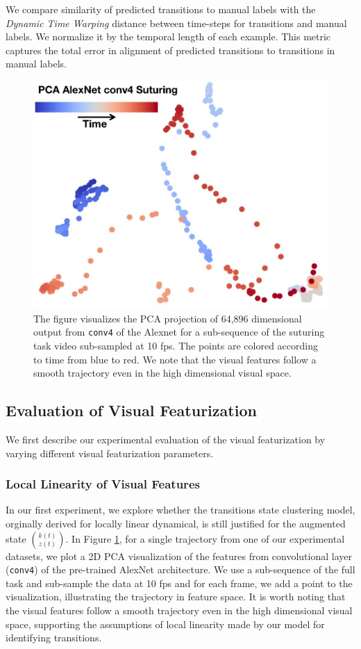 \documentclass[0-main.tex]{subfiles}
\begin{document}
We compare similarity of predicted transitions to manual labels with the \textit{Dynamic Time Warping} distance between time-steps for transitions and manual labels. We normalize it by the temporal length of each example. This metric captures the total error in alignment of predicted transitions to transitions in manual labels. 

\begin{figure}[t!]
\centering
\includegraphics[width=0.5\linewidth]{figures/pca_conv4.png}
\caption{The figure visualizes the PCA projection of 64,896 dimensional output from \texttt{conv4} of the Alexnet for a sub-sequence of the suturing task video sub-sampled at 10 fps. The points are colored according to time from blue to red. We note that the visual features follow a smooth trajectory even in the high dimensional visual space.   \label{fig:imgtraj}}
\vspace{-15pt}
\end{figure}


\subsection{Evaluation of Visual Featurization}
We first describe our experimental evaluation of the visual featurization by varying different visual featurization parameters.

\subsubsection{Local Linearity of Visual Features}
In our first experiment, we explore whether the transitions state clustering model, orginally derived for locally linear dynamical, is still justified for the augmented state $\binom{k(t)}{z(t)}$.
In Figure \ref{fig:imgtraj}, for a single trajectory from one of our experimental datasets, we plot a 2D PCA visualization of the features from convolutional layer (\texttt{conv4}) of the pre-trained AlexNet architecture. We use a sub-sequence of the full task and sub-sample the data at 10 fps and for each frame, we add a point to the visualization, illustrating the trajectory in feature space. It is worth noting that the visual features follow a smooth trajectory even in the high dimensional visual space, supporting the assumptions of local linearity made by our model for identifying transitions.
\end{document}
